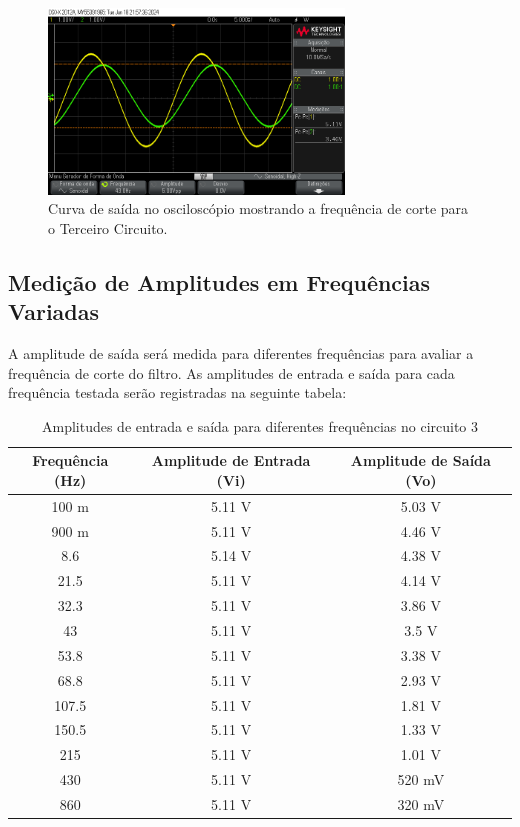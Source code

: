 \documentclass[
	12pt,				%
	openright,			%
	twoside,			%
	a4paper,			%
	english,			%
	french,				%
	spanish,			%
	brazil,				%
	]{abntex2}
\begin{document}
\begin{figure}[H]
    \centering
    \includegraphics[width=0.7\textwidth]{imgs/third_oscilloscope_cutoff_frequency.jpg}
    \caption{Curva de saída no osciloscópio mostrando a frequência de corte para o Terceiro Circuito.}
    \label{fig:third_oscilloscope_cutoff_frequency}
\end{figure}


\subsection{Medição de Amplitudes em Frequências Variadas}

A amplitude de saída será medida para diferentes frequências para avaliar a frequência de corte do filtro. As amplitudes de entrada e saída para cada frequência testada serão registradas na seguinte tabela:

\begin{table}[H]
    \centering
    \begin{tabular}{|c|c|c|}
        \hline
        Frequência (Hz) & Amplitude de Entrada (Vi) & Amplitude de Saída (Vo) \\
        \hline
        100 m & 5.11 V & 5.03 V \\
        900 m & 5.11 V & 4.46 V \\
        8.6 & 5.14 V & 4.38 V \\
        21.5 & 5.11 V & 4.14 V \\
        32.3 & 5.11 V & 3.86 V \\
        43 & 5.11 V & 3.5 V \\
        53.8 & 5.11 V & 3.38 V \\
        68.8 & 5.11 V & 2.93 V \\
        107.5 & 5.11 V & 1.81 V \\
        150.5 & 5.11 V & 1.33 V \\
        215 & 5.11 V & 1.01 V \\
        430 & 5.11 V & 520 mV \\
        860 & 5.11 V & 320 mV \\
        \hline
    \end{tabular}
    \caption{Amplitudes de entrada e saída para diferentes frequências no circuito 3}
    \label{tab:third_frequency_response}
\end{table}
\end{document}
